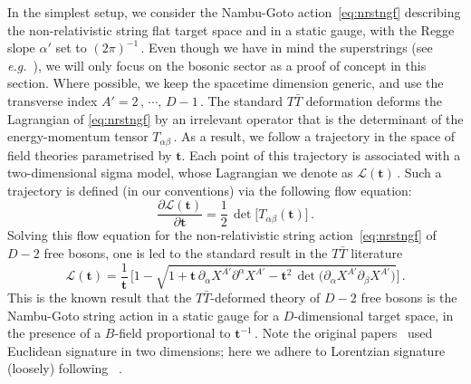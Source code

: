\documentclass[11pt]{article}
\newcommand{\be}{\begin{equation}}
\newcommand{\ee}{\end{equation}}
\newcommand{\CL}{\mathcal{L}}
\newcommand{\p}{\partial}
\renewcommand{\emph}[1]{\textit{#1}}
\newcommand{\lambdap}{\boldsymbol{t}}
\begin{document}
In the simplest setup, we consider the Nambu-Goto action~\eqref{eq:nrstngf} describing the non-relativistic string flat target space and in a static gauge, with the Regge slope $\alpha'$ set to $(2\pi)^{-1}$\,. Even though we have in mind the superstrings (see \emph{e.g.}~\cite{Gomis:2005pg, Kim:2007pc, Park:2016sbw, Blair:2019qwi}), we will only focus on the bosonic sector as a proof of concept in this section.
Where possible, we keep the spacetime dimension generic, and use the transverse index $A' = 2\,, \, \cdots, \, D-1$\,. The standard $T\bar{T}$ deformation deforms the Lagrangian of \eqref{eq:nrstngf} by an irrelevant operator that is the determinant of the energy-momentum tensor $T_{\alpha\beta}$\,. As a result, we follow a trajectory in the space of field theories parametrised by $\lambdap$.
Each point of this trajectory is associated with a two-dimensional sigma model, whose Lagrangian we denote as $\CL(\lambdap)$\,.
Such a trajectory is defined (in our conventions) via the following flow equation:
%
\be \label{eq:ttbarfe} 
   \frac{\p \CL(\lambdap)}{\p \lambdap} = \frac{1}{2} \, \det \bigl[ T^{}_{\alpha\beta} (\lambdap) \bigr]\,.
\ee
%
Solving this flow equation for the non-relativistic string action~\eqref{eq:nrstngf} of $D-2$ free bosons, one is led to the standard result in the $T\bar{T}$ literature ~\cite{Cavaglia:2016oda,Bonelli:2018kik}
%
\be
    \CL (\lambdap) = \frac{1}{\lambdap} \, \biggl[ 1-\sqrt{1 + \lambdap\, \p^{}_{\alpha} X^{A'} \p^{\alpha} X^{A'} - \lambdap^2 \, \det \bigl( \p^{}_\alpha X^{A'} \p^{}_\beta X^{A'} \bigr)}  \biggr]\,.
\ee
%
This is the known result that the $T\bar{T}$-deformed theory of $D-2$ free bosons is the Nambu-Goto string action in a static gauge for a $D$-dimensional target space, in the presence of a $B$-field proportional to $\lambdap^{-1}$\,. Note the original papers~\cite{Cavaglia:2016oda,Bonelli:2018kik} used Euclidean signature in two dimensions; here we adhere to Lorentzian signature (loosely) following ~\cite{Blair:2020ops}.
\end{document}
